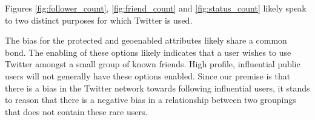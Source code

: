Figures \ref{fig:follower_count}, \ref{fig:friend_count} and \ref{fig:status_count} likely speak to two distinct purposes for which Twitter is used.

The bias for the protected and geoenabled attributes likely share a common bond.  The enabling of these options likely indicates that a user wishes to use Twitter amongst a small group of known friends.  High profile, influential public users will not generally have these options enabled.  Since our premise is that there is a bias in the Twitter network towards following influential users, it stands to reason that there is a negative bias in a relationship between two groupings that does not contain these rare users.
